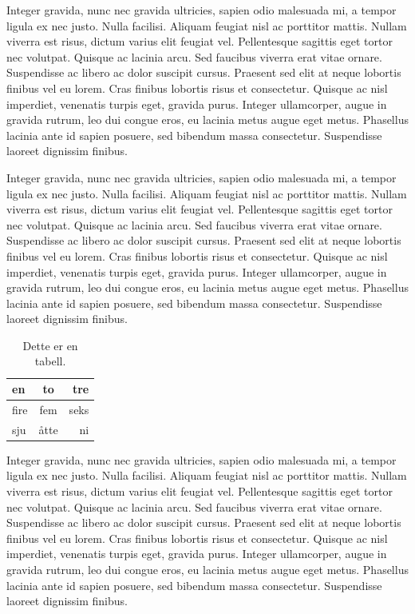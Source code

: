 \documentclass[a4paper, 12pt]{article}
\begin{document}
Integer gravida, nunc nec gravida ultricies, sapien odio malesuada mi, a tempor ligula ex nec justo. Nulla facilisi. Aliquam feugiat nisl ac porttitor mattis. Nullam viverra est risus, dictum varius elit feugiat vel. Pellentesque sagittis eget tortor nec volutpat. Quisque ac lacinia arcu. Sed faucibus viverra erat vitae ornare. Suspendisse ac libero ac dolor suscipit cursus. Praesent sed elit at neque lobortis finibus vel eu lorem. Cras finibus lobortis risus et consectetur. Quisque ac nisl imperdiet, venenatis turpis eget, gravida purus. Integer ullamcorper, augue in gravida rutrum, leo dui congue eros, eu lacinia metus augue eget metus. Phasellus lacinia ante id sapien posuere, sed bibendum massa consectetur. Suspendisse laoreet dignissim finibus.

\newpage

Integer gravida, nunc nec gravida ultricies, sapien odio malesuada mi, a tempor ligula ex nec justo. Nulla facilisi. Aliquam feugiat nisl ac porttitor mattis. Nullam viverra est risus, dictum varius elit feugiat vel. Pellentesque sagittis eget tortor nec volutpat. Quisque ac lacinia arcu. Sed faucibus viverra erat vitae ornare. Suspendisse ac libero ac dolor suscipit cursus. Praesent sed elit at neque lobortis finibus vel eu lorem. Cras finibus lobortis risus et consectetur. Quisque ac nisl imperdiet, venenatis turpis eget, gravida purus. Integer ullamcorper, augue in gravida rutrum, leo dui congue eros, eu lacinia metus augue eget metus. Phasellus lacinia ante id sapien posuere, sed bibendum massa consectetur. Suspendisse laoreet dignissim finibus.

\begin{table}[h!]
\centering
\begin{tabular}{| l | c | r |}
\hline
en&to&tre\\
\hline
fire&fem&seks\\
\hline
sju&åtte&ni\\
\hline
\end{tabular}
\caption{Dette er en tabell.}
\label{tab:tabelleksempel}
\end{table}

Integer gravida, nunc nec gravida ultricies, sapien odio malesuada mi, a tempor ligula ex nec justo. Nulla facilisi. Aliquam feugiat nisl ac porttitor mattis. Nullam viverra est risus, dictum varius elit feugiat vel. Pellentesque sagittis eget tortor nec volutpat. Quisque ac lacinia arcu. Sed faucibus viverra erat vitae ornare. Suspendisse ac libero ac dolor suscipit cursus. Praesent sed elit at neque lobortis finibus vel eu lorem. Cras finibus lobortis risus et consectetur. Quisque ac nisl imperdiet, venenatis turpis eget, gravida purus. Integer ullamcorper, augue in gravida rutrum, leo dui congue eros, eu lacinia metus augue eget metus. Phasellus lacinia ante id sapien posuere, sed bibendum massa consectetur. Suspendisse laoreet dignissim finibus.
\end{document}
